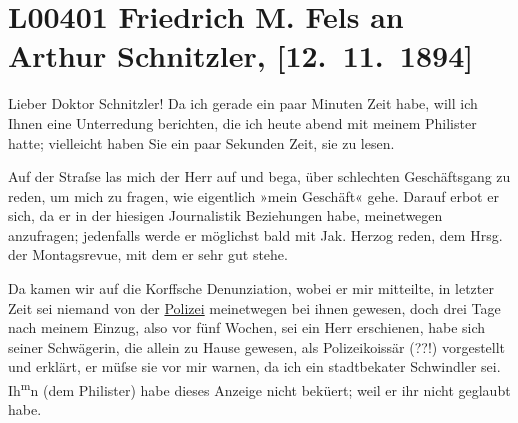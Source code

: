 

\section[Friedrich M. Fels an Arthur Schnitzler, {[}12. 11. 1894{]}]{L00401 Friedrich M. Fels an Arthur Schnitzler, {[}12. 11. 1894{]}}
\nopagebreak{}
\rehead{ }\normalsize\beginnumbering{}
\toendnotes[C]{\smallbreak\pagebreak[2]}
\toendnotes[C]{\smallbreak}
\pstart{}{\pb}Lieber Doktor Schnitzler!\pend\vspace{0.5em}
\pstart
           Da ich gerade ein paar Minuten Zeit habe, will ich Ihnen eine Unterredung berichten,
               die ich heute abend mit meinem Philister hatte; vielleicht haben Sie ein paar Sekunden Zeit, sie zu
               lesen.\pend
           
\pstart
           Auf der Straſse las mich der Herr auf und bega{\geminationn}, über
               schlechten Geschäftsgang zu reden, um mich zu fragen, wie eigentlich »mein Geschäft«
               gehe. Darauf erbot er sich, da er in der hiesigen Journalistik Beziehungen habe,
               meinetwegen anzufragen; jedenfalls werde er möglichst bald mit Jak. Herzog reden, dem Hrsg. der Montagsrevue, mit dem er sehr gut stehe.\pend
           
\pstart
           Da{\geminationn} kamen wir auf die Korffsche Denunziation, wobei er mir mitteilte, in letzter Zeit
               sei niemand von der \uline{Polizei} meinetwegen bei ihnen
               gewesen, doch drei Tage nach meinem Einzug, also vor fünf Wochen, sei ein Herr
               erschienen, habe sich seiner Schwägerin, die allein zu Hause gewesen, als Polizeiko{\geminationm}issär (??!) vorgestellt und erklärt, er müſse sie vor
               mir warnen, da ich ein stadtbeka{\geminationn}ter Schwindler sei. Ih\substVorne{}\textsuperscript{m}\substDazwischen{}n\substHinten{} (dem Philister)
               habe dieses Anzeige nicht bekü{\geminationm}ert; weil er ihr nicht
               geglaubt habe.\pend
           
